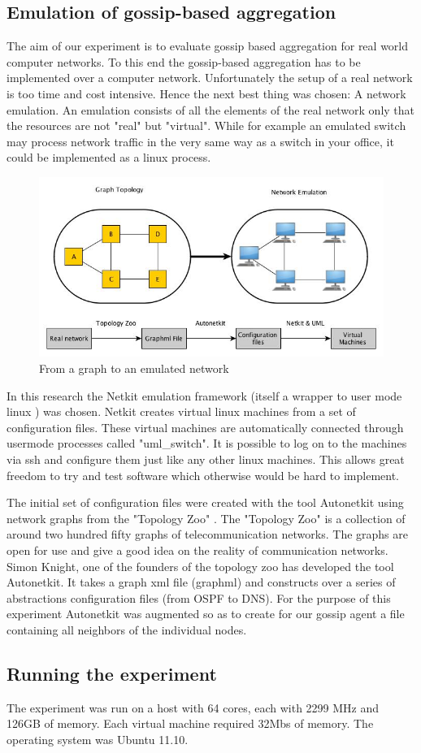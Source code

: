 \subsection{Emulation of gossip-based aggregation}
The aim of our experiment is to evaluate gossip based aggregation for real world computer networks. To this end the gossip-based aggregation has to be implemented over a computer network. Unfortunately the setup of a real network is too time and cost intensive. Hence the next best thing was chosen: A network emulation. 
An emulation consists of all the elements of the real network only that the resources are not "real" but "virtual". While for example an emulated switch may process network traffic in the very same way as a switch in your office, it could be implemented as a linux process.

\begin{figure}[h!]
    \begin{center}
        \includegraphics[scale=0.6]{graph_to_emulation}
    \end{center}
    \caption{From a graph to an emulated network}
    \label{fig:graph_to_emulation}
\end{figure}

In this research the Netkit emulation framework (itself a wrapper to user mode linux \cite{uml}) was chosen. Netkit \cite{netkit} creates virtual linux machines from a set of configuration files. These virtual machines are automatically connected through usermode processes called "uml\_switch". It is possible to log on to the machines via ssh and configure them just like any other linux machines. This allows great freedom to try and test software which otherwise would be hard to implement.

The initial set of configuration files were created with the tool Autonetkit \cite{autonetkit} using network graphs from the "Topology Zoo" \cite{knight_internet_2011}. The "Topology Zoo" is a collection of around two hundred fifty graphs of telecommunication networks. The graphs are open for use and give a good idea on the reality of communication networks. Simon Knight, one of the founders of the topology zoo has developed the tool Autonetkit. It takes a graph xml file (graphml) and constructs over a series of abstractions configuration files (from OSPF to DNS). For the purpose of this experiment Autonetkit was augmented so as to create for our gossip agent a file containing all neighbors of the individual nodes.

\subsection{Running the experiment}
The experiment was run on a host with 64 cores, each with 2299 MHz and 126GB of memory. Each virtual machine required 32Mbs of memory. The operating system was Ubuntu 11.10.
